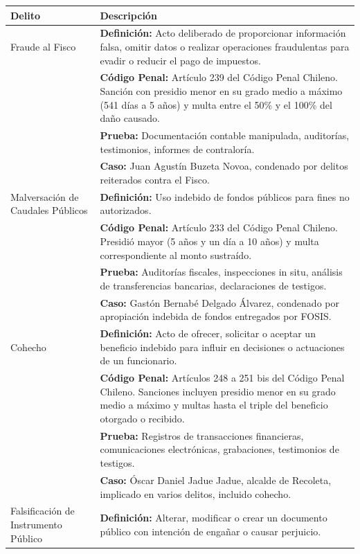\documentclass[letter,12pt]{article}
\begin{document}
	\begin{longtable}{|p{3cm}|p{12cm}|}
		\hline
		\textbf{Delito} & \textbf{Descripción} \\
		\hline
		Fraude al Fisco &
		\textbf{Definición:} Acto deliberado de proporcionar información falsa, omitir datos o realizar operaciones fraudulentas para evadir o reducir el pago de impuestos. \\
		\cline{2-2}
		& \textbf{Código Penal:} Artículo 239 del Código Penal Chileno. Sanción con presidio menor en su grado medio a máximo (541 días a 5 años) y multa entre el 50\% y el 100\% del daño causado. \\
		\cline{2-2}
		& \textbf{Prueba:} Documentación contable manipulada, auditorías, testimonios, informes de contraloría. \\
		\cline{2-2}
		& \textbf{Caso:} Juan Agustín Buzeta Novoa, condenado por delitos reiterados contra el Fisco. \\
		\hline
		Malversación de Caudales Públicos &
		\textbf{Definición:} Uso indebido de fondos públicos para fines no autorizados. \\
		\cline{2-2}
		& \textbf{Código Penal:} Artículo 233 del Código Penal Chileno. Presidió mayor (5 años y un día a 10 años) y multa correspondiente al monto sustraído. \\
		\cline{2-2}
		& \textbf{Prueba:} Auditorías fiscales, inspecciones in situ, análisis de transferencias bancarias, declaraciones de testigos. \\
		\cline{2-2}
		& \textbf{Caso:} Gastón Bernabé Delgado Álvarez, condenado por apropiación indebida de fondos entregados por FOSIS. \\
		\hline
		Cohecho &
		\textbf{Definición:} Acto de ofrecer, solicitar o aceptar un beneficio indebido para influir en decisiones o actuaciones de un funcionario. \\
		\cline{2-2}
		& \textbf{Código Penal:} Artículos 248 a 251 bis del Código Penal Chileno. Sanciones incluyen presidio menor en su grado medio a máximo y multas hasta el triple del beneficio otorgado o recibido. \\
		\cline{2-2}
		& \textbf{Prueba:} Registros de transacciones financieras, comunicaciones electrónicas, grabaciones, testimonios de testigos. \\
		\cline{2-2}
		& \textbf{Caso:} Óscar Daniel Jadue Jadue, alcalde de Recoleta, implicado en varios delitos, incluido cohecho. \\
		\hline
		Falsificación de Instrumento Público &
		\textbf{Definición:} Alterar, modificar o crear un documento público con intención de engañar o causar perjuicio. \\

\end{longtable}
\end{document}

